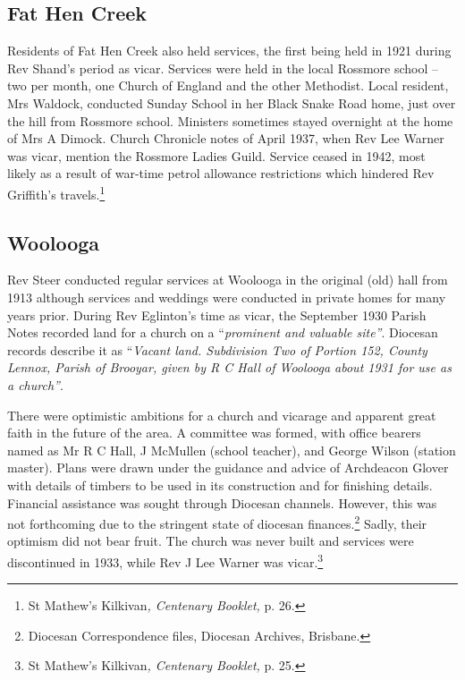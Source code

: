 \subsection{Fat Hen Creek}



Residents of Fat Hen Creek also held services, the first being held in 1921 during Rev Shand's period as vicar. Services were held in the local Rossmore school -- two per month, one Church of England and the other Methodist. Local resident, Mrs Waldock, conducted Sunday School in her Black Snake Road home, just over the hill from Rossmore school. Ministers sometimes stayed overnight at the home of Mrs A Dimock. Church Chronicle notes of April 1937, when Rev Lee Warner was vicar, mention the Rossmore Ladies Guild. Service ceased in 1942, most likely as a result of war-time petrol allowance restrictions which hindered Rev Griffith's travels.\footnote{St Mathew's Kilkivan\emph{, Centenary Booklet,} p. 26.}


\subsection{Woolooga}



Rev Steer conducted regular services at Woolooga in the original (old) hall from 1913 although services and weddings were conducted in private homes for many years prior. During Rev Eglinton's time as vicar, the September 1930 Parish Notes recorded land for a church on a ``\emph{prominent and valuable site''}. Diocesan records describe it as ``\emph{Vacant land. Subdivision Two of Portion 152, County Lennox, Parish of Brooyar, given by R C Hall of Woolooga about 1931 for use as a church''}.



There were optimistic ambitions for a church and vicarage and apparent great faith in the future of the area. A committee was formed, with office bearers named as Mr R C Hall, J McMullen (school teacher), and George Wilson (station master). Plans were drawn under the guidance and advice of Archdeacon Glover with details of timbers to be used in its construction and for finishing details. Financial assistance was sought through Diocesan channels. However, this was not forthcoming due to the stringent state of diocesan finances.\footnote{Diocesan Correspondence files, Diocesan Archives, Brisbane.} Sadly, their optimism did not bear fruit. The church was never built and services were discontinued in 1933, while Rev J Lee Warner was vicar.\footnote{St Mathew's Kilkivan\emph{, Centenary Booklet,} p. 25.}


